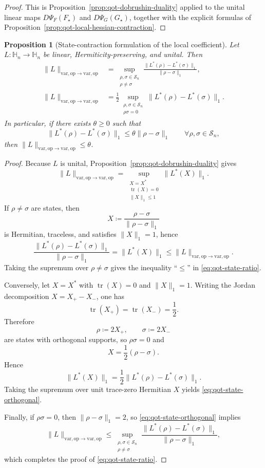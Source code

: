 \documentclass[11pt]{article}
\newcommand{\tr}{\operatorname{tr}}
\newcommand{\eqdef}{\coloneqq}
\newcommand{\Hh}{\mathbb{H}}
\newcommand{\Ss}{\mathcal{S}}
\newcommand{\op}{\mathrm{op}}
\newcommand{\varop}{\mathrm{var},\op}
\theoremstyle{plain}
\newtheorem{proposition}{Proposition}[section]
\begin{document}
\begin{proof}
This is Proposition~\ref{prop:qot-dobrushin-duality} applied to the unital linear maps
$D\Psi_F(F_\star)$ and $D\Psi_G(G_\star)$, together with the explicit formulas of Proposition~\ref{prop:qot-local-hessian-contraction}.
\end{proof}

\begin{proposition}[State-contraction formulation of the local coefficient]
\label{prop:qot-local-state-contraction}
Let $L:\Hh_n\to\Hh_n$ be linear, Hermiticity-preserving, and unital.
Then
\begin{align}
\|L\|_{\varop\to\varop}
&=
\sup_{\substack{\rho,\sigma\in \Ss_n\\ \rho\neq \sigma}}
\frac{\|L^\ast(\rho)-L^\ast(\sigma)\|_1}{\|\rho-\sigma\|_1},
\label{eq:qot-state-ratio}\\
\|L\|_{\varop\to\varop}
&=
\frac12
\sup_{\substack{\rho,\sigma\in \Ss_n\\ \rho\sigma=0}}
\|L^\ast(\rho)-L^\ast(\sigma)\|_1.
\label{eq:qot-state-orthogonal}
\end{align}
In particular, if there exists $\theta\ge 0$ such that
\[
\|L^\ast(\rho)-L^\ast(\sigma)\|_1
\le
\theta \|\rho-\sigma\|_1
\qquad \forall \rho,\sigma\in \Ss_n,
\]
then $\|L\|_{\varop\to\varop}\le \theta$.
\end{proposition}

\begin{proof}
Because $L$ is unital, Proposition~\ref{prop:qot-dobrushin-duality} gives
\[
\|L\|_{\varop\to\varop}
=
\sup_{\substack{X=X^\ast\\ \tr(X)=0\\ \|X\|_1\le 1}}
\|L^\ast(X)\|_1.
\]
If $\rho\neq \sigma$ are states, then
\[
X \eqdef \frac{\rho-\sigma}{\|\rho-\sigma\|_1}
\]
is Hermitian, traceless, and satisfies $\|X\|_1=1$, hence
\[
\frac{\|L^\ast(\rho)-L^\ast(\sigma)\|_1}{\|\rho-\sigma\|_1}
=
\|L^\ast(X)\|_1
\le
\|L\|_{\varop\to\varop}.
\]
Taking the supremum over $\rho\neq \sigma$ gives the inequality ``$\le$'' in \eqref{eq:qot-state-ratio}.

Conversely, let $X=X^\ast$ with $\tr(X)=0$ and $\|X\|_1=1$.
Writing the Jordan decomposition $X=X_+-X_-$, one has
\[
\tr(X_+)=\tr(X_-)=\frac12.
\]
Therefore
\[
\rho \eqdef 2X_+,
\qquad
\sigma \eqdef 2X_-
\]
are states with orthogonal supports, so $\rho\sigma=0$ and
\[
X=\frac12(\rho-\sigma).
\]
Hence
\[
\|L^\ast(X)\|_1
=
\frac12\|L^\ast(\rho)-L^\ast(\sigma)\|_1.
\]
Taking the supremum over unit trace-zero Hermitian $X$ yields \eqref{eq:qot-state-orthogonal}.

Finally, if $\rho\sigma=0$, then $\|\rho-\sigma\|_1=2$, so \eqref{eq:qot-state-orthogonal} implies
\[
\|L\|_{\varop\to\varop}
\le
\sup_{\substack{\rho,\sigma\in \Ss_n\\ \rho\neq \sigma}}
\frac{\|L^\ast(\rho)-L^\ast(\sigma)\|_1}{\|\rho-\sigma\|_1},
\]
which completes the proof of \eqref{eq:qot-state-ratio}.
\end{proof}
\end{document}
